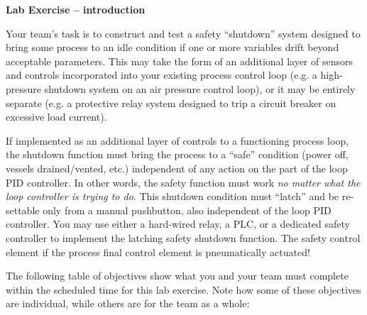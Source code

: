 \begin{itemize}





\noindent
{\bf Lab Exercise -- introduction}

\vskip 5pt

Your team's task is to construct and test a safety ``shutdown'' system designed to bring some process to an idle condition if one or more variables drift beyond acceptable parameters.  This may take the form of an additional layer of sensors and controls incorporated into your existing process control loop (e.g. a high-pressure shutdown system on an air pressure control loop), or it may be entirely separate (e.g. a protective relay system designed to trip a circuit breaker on excessive load current).

If implemented as an additional layer of controls to a functioning process loop, the shutdown function must bring the process to a ``safe'' condition (power off, vessels drained/vented, etc.) independent of any action on the part of the loop PID controller.  In other words, the safety function must work {\it no matter what the loop controller is trying to do}.  This shutdown condition must ``latch'' and be re-settable only from a manual pushbutton, also independent of the loop PID controller.  You may use either a hard-wired relay, a PLC, or a dedicated safety controller to implement the latching safety shutdown function.  The safety control element  if the process final control element is pneumatically actuated!

The following table of objectives show what you and your team must complete within the scheduled time for this lab exercise.  Note how some of these objectives are individual, while others are for the team as a whole:




\end{itemize}

